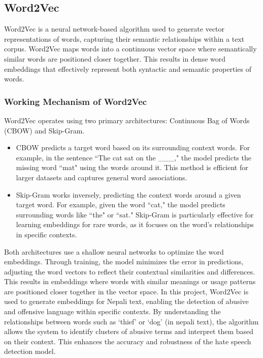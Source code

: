 \subsection{Word2Vec}
Word2Vec is a neural network-based algorithm used to generate vector representations of words, capturing their semantic relationships within a text corpus. Word2Vec maps words into a continuous vector space where semantically similar words are positioned closer together. This results in dense word embeddings that effectively represent both syntactic and semantic properties of words.

\subsubsection{Working Mechanism of Word2Vec}
Word2Vec operates using two primary architectures: Continuous Bag of Words (CBOW) and Skip-Gram.
\begin{itemize}
\item CBOW predicts a target word based on its surrounding context words. For example, in the sentence ``The cat sat on the \_\_\_," the model predicts the missing word ``mat" using the words around it. This method is efficient for larger datasets and captures general word associations.
\item Skip-Gram works inversely, predicting the context words around a given target word. For example, given the word ``cat," the model predicts surrounding words like ``the" or ``sat." Skip-Gram is particularly effective for learning embeddings for rare words, as it focuses on the word's relationships in specific contexts.
\end{itemize}

Both architectures use a shallow neural networks to optimize the word embeddings. Through training, the model minimizes the error in predictions, adjusting the word vectors to reflect their contextual similarities and differences. This results in embeddings where words with similar meanings or usage patterns are positioned closer together in the vector space.
In this project, Word2Vec is used to generate embeddings for Nepali text, enabling the detection of abusive and offensive language within specific contexts. By understanding the relationships between words such as `thief' or `dog' (in nepali text), the algorithm allows the system to identify clusters of abusive terms and interpret them based on their context. This enhances the accuracy and robustness of the hate speech detection model.

